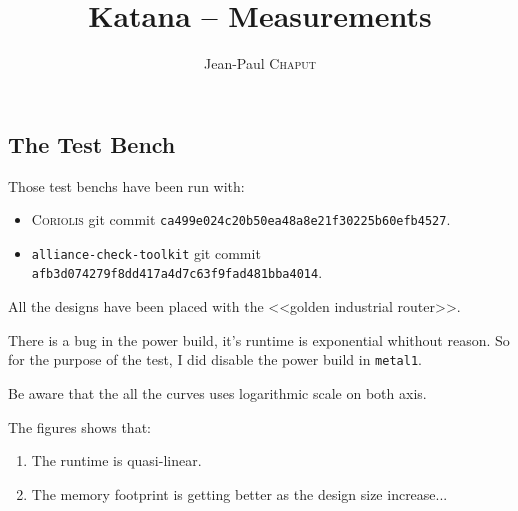 \documentclass[11pt]{article}
\newcommand {\Chaput} {\textsc{Chaput}\xspace}
\begin{document}
   

   \title{Katana -- Measurements}
   \author{Jean-Paul \Chaput}

   \maketitle

   \thispagestyle{fancy}

   \subsection*{The Test Bench}

   Those test benchs have been run with:
   \begin{itemize}
      \item \textsc{Coriolis}\xspace                git commit \texttt{ca499e024c20b50ea48a8e21f30225b60efb4527}.
      \item \texttt{alliance-check-toolkit}\xspace  git commit \texttt{afb3d074279f8dd417a4d7c63f9fad481bba4014}.
   \end{itemize}

   All the designs have been placed with the <<golden industrial router>>.

   There is a bug in the power build, it's runtime is exponential whithout
   reason. So for the purpose of the test, I did disable the power build
   in \texttt{metal1}.

   Be aware that the all the curves uses logarithmic scale on both axis.

   The figures shows that:
   \begin{enumerate}
     \item The runtime is quasi-linear.
     \item The memory footprint is getting better as the design size
           increase...
   \end{enumerate}


   \begin{center}
   \end{center}
   \begin{center}
   \end{center}


%  
%      
\end{document}
